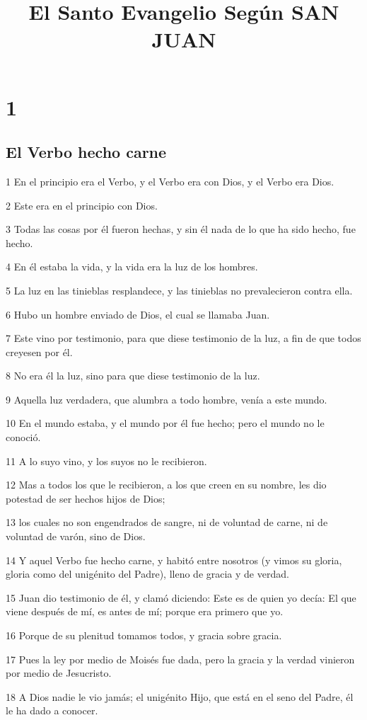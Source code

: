 
\title{El Santo Evangelio Según SAN JUAN}

\chapter{1}

\section*{El Verbo hecho carne}

\par 1 En el principio era el Verbo, y el Verbo era con Dios, y el Verbo era Dios.
\par 2 Este era en el principio con Dios.
\par 3 Todas las cosas por él fueron hechas, y sin él nada de lo que ha sido hecho, fue hecho.
\par 4 En él estaba la vida, y la vida era la luz de los hombres.
\par 5 La luz en las tinieblas resplandece, y las tinieblas no prevalecieron contra ella.
\par 6 Hubo un hombre enviado de Dios, el cual se llamaba Juan.
\par 7 Este vino por testimonio, para que diese testimonio de la luz, a fin de que todos creyesen por él.
\par 8 No era él la luz, sino para que diese testimonio de la luz.
\par 9 Aquella luz verdadera, que alumbra a todo hombre, venía a este mundo.
\par 10 En el mundo estaba, y el mundo por él fue hecho; pero el mundo no le conoció.
\par 11 A lo suyo vino, y los suyos no le recibieron.
\par 12 Mas a todos los que le recibieron, a los que creen en su nombre, les dio potestad de ser hechos hijos de Dios;
\par 13 los cuales no son engendrados de sangre, ni de voluntad de carne, ni de voluntad de varón, sino de Dios.
\par 14 Y aquel Verbo fue hecho carne, y habitó entre nosotros (y vimos su gloria, gloria como del unigénito del Padre), lleno de gracia y de verdad.
\par 15 Juan dio testimonio de él, y clamó diciendo: Este es de quien yo decía: El que viene después de mí, es antes de mí; porque era primero que yo.
\par 16 Porque de su plenitud tomamos todos, y gracia sobre gracia.
\par 17 Pues la ley por medio de Moisés fue dada, pero la gracia y la verdad vinieron por medio de Jesucristo.
\par 18 A Dios nadie le vio jamás; el unigénito Hijo, que está en el seno del Padre, él le ha dado a conocer.

